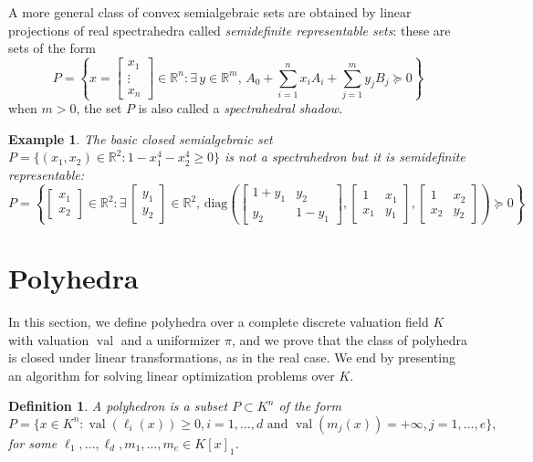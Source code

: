 \documentclass[a4paper,oneside,11pt]{article}
\newtheorem{definition}[theorem]{Definition}
\newtheorem{example}[theorem]{Example}
\newcommand{\R}{\mathbb{R}} %
\DeclareMathOperator{\val}{val}
\def\diag{\mathrm{diag}}
\begin{document}
A more general class of convex semialgebraic sets are obtained by linear projections of real spectrahedra
called \emph{semidefinite representable sets}: these are sets of the form
$$
P = \left\{x = \left[\begin{smallmatrix} x_1 \\ \vdots \\ x_n \end{smallmatrix}\right] \in \R^n : \exists\,y\in\R^m, \, A_0 + \sum_{i=1}^n x_i A_i + \sum_{j=1}^m y_j B_j \succeq 0\right\}
$$
when $m>0$, the set $P$ is also called a \emph{spectrahedral shadow}.

\begin{example}
\label{fermat_quartic}
The basic closed semialgebraic set $P = \{(x_1,x_2) \in \R^2 : 1-x_1^4-x_2^4 \geq 0\}$ is not a spectrahedron
but it is semidefinite representable:
$$
P = \left\{\begin{bmatrix} x_1 \\ x_2 \end{bmatrix} \in \R^2 :
\exists\,
\begin{bmatrix} y_1 \\ y_2 \end{bmatrix} \in \R^2, \,
\diag\left(
\begin{bmatrix}
  1+y_1 & y_2 \\
  y_2 & 1-y_1
\end{bmatrix},
\begin{bmatrix}
  1 & x_1 \\
  x_1 & y_1
\end{bmatrix},
\begin{bmatrix}
  1 & x_2 \\
  x_2 & y_2
\end{bmatrix}
\right)
\succeq 0
\right\}
$$
\end{example}


\section{Polyhedra}

In this section, we define polyhedra over a complete discrete valuation field $K$ with valuation $\val$ and a uniformizer $\pi$, and we prove that the class of polyhedra is closed under linear transformations, as in the real case. We end by presenting an algorithm for solving linear optimization problems over $K$.

\begin{definition}
  \label{def_polyhedra}
  A \emph{polyhedron} is a subset $P \subset K^n$ of the form
  $$
  P = \{x \in K^n : \val(\ell_i(x)) \geq 0, i=1,\ldots,d \text{ and }
  \val(m_j(x)) = +\infty, j=1,\ldots,e\},
  $$
  for some $\ell_1,\ldots,\ell_d,m_1,\ldots,m_e \in K[x]_1$.
\end{definition}
\end{document}

